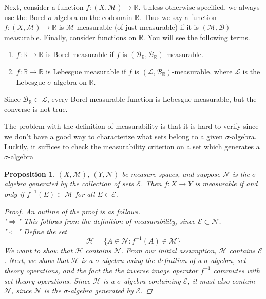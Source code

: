 \documentclass[10pt]{article}         %
\newtheorem{proposition}{Proposition}[section]
\theoremstyle{remark}
\newcommand{\R}{\mathbb{R}}
\begin{document}
Next, consider a function $f: (X,\mathcal{M}) \rightarrow \R$. Unless otherwise specified, we always use the Borel $\sigma$-algebra on the codomain $\R$. Thus we say a function $f: (X,\mathcal{M}) \rightarrow \R$ is $\mathcal{M}$-measurable (of just measurable) if it is $(\mathcal{M},\mathcal{B})$-measurable. Finally, consider functions on $\R$. You will see the following terms.
\begin{enumerate}
    \item $f: \R \rightarrow \R$ is Borel measurable if $f$ is $(\mathcal{B}_\R,\mathcal{B}_\R)$-measurable.
    \item $f: \R \rightarrow \R$ is Lebesgue measurable if $f$ is $(\mathcal{L},\mathcal{B}_\R)$-measurable, where $\mathcal{L}$ is the Lebesgue $\sigma$-algebra on $\R$.
\end{enumerate}
Since $\mathcal{B}_\R \subset \mathcal{L}$, every Borel measurable function is Lebesgue measurable, but the converse is not true.

The problem with the definition of measurability is that it is hard to verify since we don't have a good way to characterize what sets belong to a given $\sigma$-algebra. Luckily, it suffices to check the measurability criterion on a set which generates a $\sigma$-algebra

\begin{proposition}
$(X,\mathcal{M})$, $(Y,\mathcal{N})$ be measure spaces, and suppose $\mathcal{N}$ is the $\sigma$-algebra generated by the collection of sets $\mathcal{E}$. Then $f: X \to Y$ is measurable if and only if $f^{-1}(E) \subset \mathcal{M}$ for all $E \in \mathcal{E}$.

\begin{proof}An outline of the proof is as follows.\\
"$\Rightarrow$" This follows from the definition of measurability, since $\mathcal{E} \subset \mathcal{N}$.\\
"$\Leftarrow$" Define the set
\[
\mathcal{H}=\{A \in \mathcal{N}: f^{-1}(A) \in \mathcal{M}\}
\]
We want to show that $\mathcal{H}$ contains $\mathcal{N}$. From our initial assumption, $\mathcal{H}$ contains $\mathcal{E}$. Next, we show that $\mathcal{H}$ is a $\sigma$-algebra using the definition of a $\sigma$-algebra, set-theory operations, and the fact the the inverse image operator $f^{-1}$ commutes with set theory operations. Since $\mathcal{H}$ is a $\sigma$-algebra containing $\mathcal{E}$, it must also contain $\mathcal{N}$, since $\mathcal{N}$ is the $\sigma$-algebra generated by $\mathcal{E}$.
\end{proof}
\end{proposition}
\end{document}
